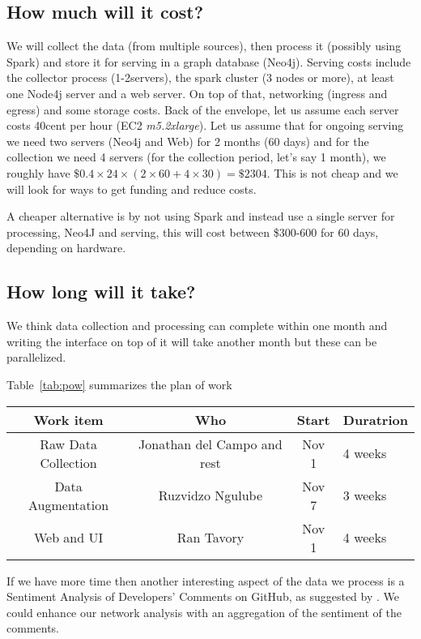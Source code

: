 \documentclass[sigconf,11pt]{acmart}
\begin{document}
\subsection*{How much will it cost?}
We will collect the data (from multiple sources), then process it (possibly using Spark) and
store it for serving in a graph database (Neo4j\cite{neo4j}).
Serving costs include the collector process (1-2servers), the spark cluster (3 nodes or more),
at least one Node4j server and a web server.
On top of that, networking (ingress and egress) and some storage costs.
Back of the envelope, let us assume each server costs 40cent per hour (EC2 \emph{m5.2xlarge}).
Let us assume that for ongoing serving we need two servers (Neo4j and Web) for 2 months (60 days)
and for the collection we need 4 servers (for the collection period, let's say 1 month),
we roughly have $\$0.4 \times 24 \times (2 \times 60 + 4 \times 30) = \$2304$.
This is not cheap and we will look for ways to get funding and reduce costs.

A cheaper alternative is by not using Spark and instead use a single server for processing, Neo4J and serving, this
will cost between \$300-600 for 60 days, depending on hardware.

\subsection*{How long will it take?}
We think data collection and processing can complete within one month and writing the interface on top of it will take another month
but these can be parallelized.

Table~\ref{tab:pow} summarizes the plan of work

\begin{table*}
  \caption{Plan of Work}
  \label{tab:pow}
  \begin{tabular}{cccl}
    \toprule
    Work item               & Who                         & Start   &  Duratrion\\
    \midrule
    Raw Data Collection     & Jonathan del Campo and rest & Nov 1   & 4 weeks \\
    Data Augmentation       & Ruzvidzo Ngulube            & Nov 7   & 3 weeks \\
    Web and UI              & Ran Tavory                  & Nov 1   & 4 weeks\\
  \bottomrule
\end{tabular}
\end{table*}

If we have more time then another interesting aspect of the data we process is a
Sentiment Analysis of Developers' Comments on GitHub, as suggested by \citeauthor{sentiment-analysis}\cite{sentiment-analysis}.
We could enhance our network analysis with an aggregation of the sentiment of the comments.
\end{document}
